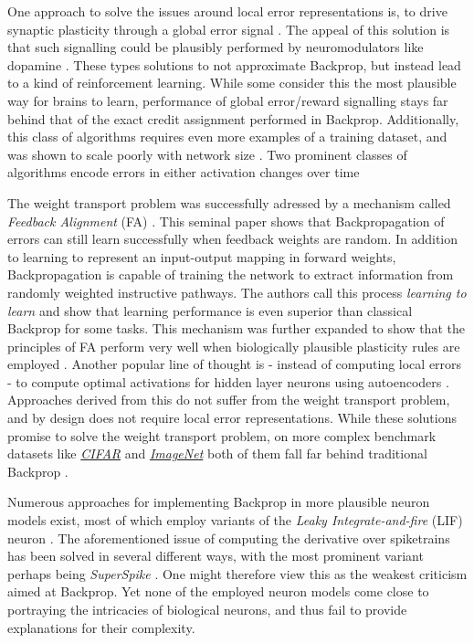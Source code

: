 One approach to solve the issues around local error representations is, to drive synaptic plasticity through a global
error signal \citeme. The appeal of this solution is that such signalling could be plausibly performed by
neuromodulators like dopamine \citep{Mazzoni1991,Seung2003,izhikevich2007solving}. These types solutions to not
approximate Backprop, but instead lead to a kind of reinforcement learning. While some consider this the most plausible
way for brains to learn, performance of global error/reward signalling stays far behind that of the exact credit
assignment performed in Backprop. Additionally, this class of algorithms requires even more examples of a training
dataset, and was shown to scale poorly with network size \citep{Werfel2003}. Two prominent classes of algorithms
encode errors in either activation changes over time \citep{} 


The weight transport problem was successfully adressed by a mechanism called \textit{Feedback Alignment} (FA)
\citep{Lillicrap2014}. This seminal paper shows that Backpropagation of errors can still learn successfully when
feedback weights are random. In addition to learning to represent an input-output mapping in forward weights,
Backpropagation is capable of training the network to extract information from randomly weighted instructive pathways.
The authors call this process \textit{learning to learn} and show that learning performance is even superior than
classical Backprop for some tasks. This mechanism was further expanded to show that the principles of FA perform very
well when biologically plausible plasticity rules are employed \citep{Liao2016,Zenke2018}. Another popular line of
thought is - instead of computing local errors - to compute optimal activations for hidden layer neurons using
autoencoders \citep{Bengio2014,Lee2015,Ahmad2020}. Approaches derived from this do not suffer from the weight transport
problem, and by design does not require local error representations. While these solutions promise to solve the weight
transport problem, on more complex benchmark datasets like
\textit{\href{https://www.cs.toronto.edu/~kriz/cifar.html}{CIFAR}} and
\textit{\href{https://www.image-net.org/index.php}{ImageNet}} both of them fall far behind traditional Backprop
\citep{Bartunov2018}.

Numerous approaches for implementing Backprop in more plausible neuron models exist, most of which employ variants of
the \textit{Leaky Integrate-and-fire} (LIF) neuron \citep{Sporea2013,Lee2016,Bengio2017,Lee2020}. The aforementioned
issue of computing the derivative over spiketrains has been solved in several different ways, with the most prominent
variant perhaps being \textit{SuperSpike} \citep{Zenke2018}. One might therefore view this as the weakest criticism
aimed at Backprop. Yet none of the employed neuron models come close to portraying the intricacies of biological
neurons, and thus fail to provide explanations for their complexity.\newline

